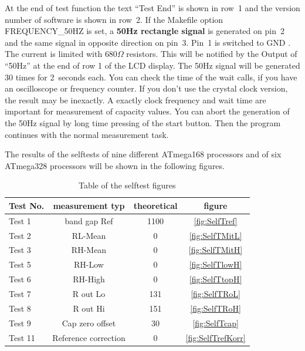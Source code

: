 At the end of test function the text ``Test End''  is shown in row~1 and the version number of software is shown in row~2.
If the Makefile option FREQUENCY\_50HZ is set, a {\bf 50Hz rectangle signal} is generated on pin~2 and 
the same signal in opposite direction on pin~3.
Pin~1 is switched to GND . The current is limited with \(680\Omega\) resistors.
This will be notified by the Output of ``50Hz'' at the end of row 1 of the LCD display.
The 50Hz signal will be generated 30 times for 2~seconds each.
You can check the time of the wait calls, if you have an oscilloscope or frequency counter.
If you don't use the crystal clock version, the result may be inexactly.
A exactly clock frequency and wait time are important for measurement of capacity values.
You can abort the generation of the 50Hz signal by long time pressing of the start button.
Then the program continues with the normal measurement task.


The results of the selftests of nine different ATmega168 processors and of six ATmega328 processors
will be shown in the following figures.

\begin{table}[H]
  \begin{center}
    \begin{tabular}{| l | c | c | c |}
    \hline
Test No. & measurement typ & theoretical & figure \\
    \hline
    \hline
Test 1 & band gap Ref  & 1100 & \ref{fig:SelfTref} \\
    \hline
Test 2 & RL-Mean & 0 & \ref{fig:SelfTMitL} \\
    \hline
Test 3 & RH-Mean & 0 & \ref{fig:SelfTMitH} \\
    \hline
Test 5 & RH-Low &  0 & \ref{fig:SelfTlowH} \\
    \hline
Test 6 & RH-High & 0 & \ref{fig:SelfTtopH} \\
    \hline
Test 7 & R out Lo & 131 & \ref{fig:SelfTRoL} \\
    \hline
Test 8 & R out Hi & 151 & \ref{fig:SelfTRoH} \\
    \hline
Test 9 & Cap zero offset & 30 & \ref{fig:SelfTcap} \\
    \hline
Test 11 & Reference correction & 0 & \ref{fig:SelfTrefKorr} \\
    \hline
    \end{tabular}
  \end{center}
  \caption{Table of the selftest figures }
  \label{tab:test_m168} 
\end{table}

